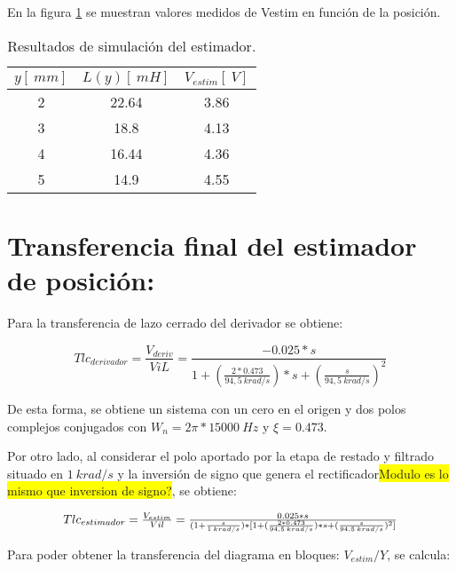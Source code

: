 \noindent En la figura \ref{tab_Resultados_de_simulación_del_estimador} se muestran valores medidos de Vestim en funci\'{o}n de la posici\'{o}n.

\begin{table}[H]
	\begin{center}
		\begin{tabular}{| c | c | c |}
			\hline
		$y [\:mm]$ & $L(y) [\:mH]$ & $V_{estim} [\:V]$ \\ \hline 
		2 & 22.64 & 3.86 \\ \hline 
		3 & 18.8 & 4.13 \\ \hline 
		4 & 16.44 & 4.36 \\ \hline 
		5 & 14.9 & 4.55 \\ \hline 
		\end{tabular}
		\caption{Resultados de simulación del estimador.}
		\label{tab_Resultados_de_simulación_del_estimador}
	\end{center}
\end{table}

\section{Transferencia final del estimador de posici\'{o}n:}

\noindent Para la transferencia de lazo cerrado del derivador se obtiene:

\begin{equation} \label{eq_TLC_deriv_1}
	{Tlc}_{derivador}=\frac{V_{deriv}}{ViL}=\frac{-0.025*s}{1+(\frac{2*0.473}{94,5\ krad/s})*s+(\frac{s}{94,5\ krad/s})^2}
\end{equation}

\noindent De esta forma, se obtiene un sistema con un cero en el origen y dos polos complejos conjugados con $W_n=2\pi *15000 \:Hz$ y  $\xi =0.473$.

\noindent Por otro lado, al considerar el polo aportado por la etapa de restado y filtrado situado en $1 \:{krad/s}$ y la inversi\'{o}n de signo que genera el rectificador\colorbox{yellow}{Modulo es lo mismo que inversion de signo?}, se obtiene:

\begin{equation} \label{eq_TLC_deriv_2}
	\resizebox{.8\hsize}{!}
	{
	$
	{Tlc}_{estimador}=\frac{V_{estim}}{Vil}=\frac{0.025*s}{(1+\frac{s}{1 \:{krad/s}})*[1+(\frac{2*0.473}{94,5 \:{krad/s}})*s+(\frac{s}{94,5 \:{krad/s}})^2]}
	$
	}
\end{equation}

\noindent Para poder obtener la transferencia del diagrama en bloques: $V_{estim}/Y$, se calcula:

